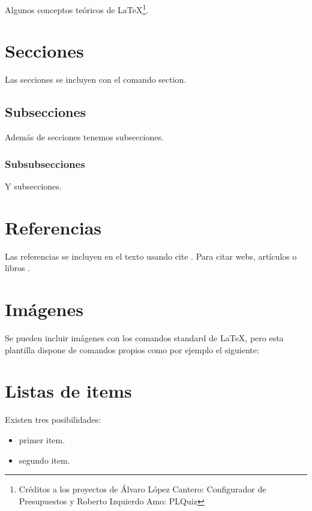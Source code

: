 Algunos conceptos teóricos de \LaTeX \footnote{Créditos a los proyectos de Álvaro López Cantero: Configurador de Presupuestos y Roberto Izquierdo Amo: PLQuiz}.

\section{Secciones}

Las secciones se incluyen con el comando section.

\subsection{Subsecciones}

Además de secciones tenemos subsecciones.

\subsubsection{Subsubsecciones}

Y subsecciones. 


\section{Referencias}

Las referencias se incluyen en el texto usando cite \cite{wiki:latex}. Para citar webs, artículos o libros \cite{koza92}.


\section{Imágenes}

Se pueden incluir imágenes con los comandos standard de \LaTeX, pero esta plantilla dispone de comandos propios como por ejemplo el siguiente:




\section{Listas de items}

Existen tres posibilidades:

\begin{itemize}
	\item primer item.
	\item segundo item.
\end{itemize}

